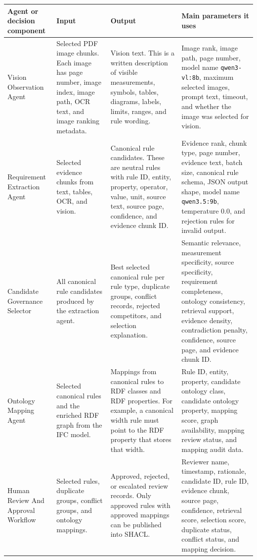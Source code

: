 \documentclass[11pt,a4paper]{article}
\begin{document}
\begin{longtable}{|p{3.1cm}|p{3.5cm}|p{3.8cm}|p{4.7cm}|}
\hline
\textbf{Agent or decision component} & \textbf{Input} & \textbf{Output} & \textbf{Main parameters it uses} \\
\hline
Vision Observation Agent &
Selected PDF image chunks. Each image has page number, image index, image path, OCR text, and image ranking metadata. &
Vision text. This is a written description of visible measurements, symbols, tables, diagrams, labels, limits, ranges, and rule wording. &
Image rank, image path, page number, model name \texttt{qwen3-vl:8b}, maximum selected images, prompt text, timeout, and whether the image was selected for vision. \\
\hline
Requirement Extraction Agent &
Selected evidence chunks from text, tables, OCR, and vision. &
Canonical rule candidates. These are neutral rules with rule ID, entity, property, operator, value, unit, source text, source page, confidence, and evidence chunk ID. &
Evidence rank, chunk type, page number, evidence text, batch size, canonical rule schema, JSON output shape, model name \texttt{qwen3.5:9b}, temperature 0.0, and rejection rules for invalid output. \\
\hline
Candidate Governance Selector &
All canonical rule candidates produced by the extraction agent. &
Best selected canonical rule per rule type, duplicate groups, conflict records, rejected competitors, and selection explanation. &
Semantic relevance, measurement specificity, source specificity, requirement completeness, ontology consistency, retrieval support, evidence density, contradiction penalty, confidence, source page, and evidence chunk ID. \\
\hline
Ontology Mapping Agent &
Selected canonical rules and the enriched RDF graph from the IFC model. &
Mappings from canonical rules to RDF classes and RDF properties. For example, a canonical width rule must point to the RDF property that stores that width. &
Rule ID, entity, property, candidate ontology class, candidate ontology property, mapping score, graph availability, mapping review status, and mapping audit data. \\
\hline
Human Review And Approval Workflow &
Selected rules, duplicate groups, conflict groups, and ontology mappings. &
Approved, rejected, or escalated review records. Only approved rules with approved mappings can be published into SHACL. &
Reviewer name, timestamp, rationale, candidate ID, rule ID, evidence chunk, source page, confidence, retrieval score, selection score, duplicate status, conflict status, and mapping decision. \\
\hline
\end{longtable}
\end{document}
